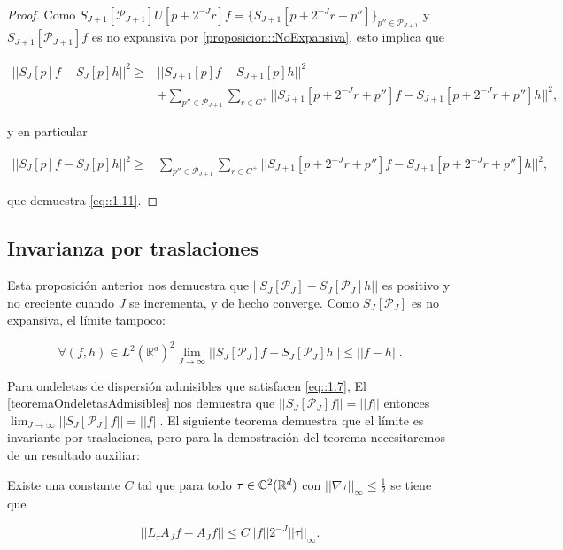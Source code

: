 \begin{proof}
\noindent Como $S_{J+1}[\mathcal{P}_{J+1}]U[p+2^{-J}r]f=\lbrace S_{J+1} [p+2^{-J}r+p'']\rbrace_{p''\in\mathcal{P}_{J+1}}$  y $S_{J+1}[\mathcal{P}_{J+1}]f$ es no expansiva por \autoref{proposicion::NoExpansiva}, esto implica que

\begin{align*}
    ||S_{J}[p]f - S_J[p]h||^2 \geq & ||S_{J+1}[p]f-S_{J+1}[p]h||^2 \\
    & + \sum_{p''\in \mathcal{P}_{J+1}} \sum_{r\in G^+} || S_{J+1}[p+2^{-J}r+p'']f- S_{J+1}[p+2^{-J}r+p'']h||^2,
\end{align*}

\noindent y en particular

\begin{align*}
  ||S_{J}[p]f - S_J[p]h||^2 \geq & \sum_{p''\in \mathcal{P}_{J+1}} \sum_{r\in G^+} || S_{J+1}[p+2^{-J}r+p'']f- S_{J+1}[p+2^{-J}r+p'']h||^2,
\end{align*}

\noindent que demuestra \eqref{eq::1.11}. \qedhere
\end{proof}


\subsection{Invarianza por traslaciones}

\noindent Esta proposición anterior nos demuestra que $||S_J[\mathcal{P}_J]-S_J[\mathcal{P}_J]h||$ es positivo y no creciente cuando $J$ se incrementa, y de hecho converge. Como $S_J[\mathcal{P}_J]$ es no expansiva, el límite tampoco: 

$$\forall (f,h)\in L^2(\mathbb{R}^d)^2 \lim_{J\rightarrow\infty} ||S_J[\mathcal{P}_J]f-S_{J}[\mathcal{P}_J]h|| \leq ||f-h||.$$

\medskip

\noindent Para ondeletas de dispersión admisibles que satisfacen \eqref{eq::1.7}, El \autoref{teoremaOndeletasAdmisibles} nos demuestra que $||S_J[\mathcal{P}_J]f||=||f||$ entonces $\lim_{J\rightarrow\infty}||S_J[\mathcal{P}_J]f||=||f||$. El siguiente teorema demuestra que el límite es invariante por traslaciones, pero para la demostración del teorema necesitaremos de un resultado auxiliar: 

\begin{lema} \label{lema::constante}
  Existe una constante $C$ tal que para todo $\tau \in \mathbb{C}^2(\mathbb{R}^d)$ con $||\nabla \tau ||_\infty \leq \frac{1}{2}$ se tiene que 
  
  $$||L_\tau A_J f - A_J f|| \leq C ||f||2^{-J}||\tau||_{\infty}.$$
\end{lema}

